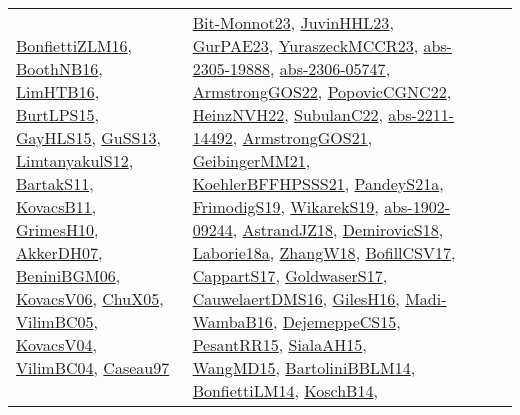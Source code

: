 {\begin{longtable}{llp{6cm}p{6cm}p{6cm}}
\href{papers/BonfiettiZLM16.pdf}{BonfiettiZLM16}\cite{BonfiettiZLM16}, \href{papers/BoothNB16.pdf}{BoothNB16}\cite{BoothNB16}, \href{papers/LimHTB16.pdf}{LimHTB16}\cite{LimHTB16}, \href{papers/BurtLPS15.pdf}{BurtLPS15}\cite{BurtLPS15}, \href{papers/GayHLS15.pdf}{GayHLS15}\cite{GayHLS15}, \href{papers/GuSS13.pdf}{GuSS13}\cite{GuSS13}, \href{articles/LimtanyakulS12.pdf}{LimtanyakulS12}\cite{LimtanyakulS12}, \href{articles/BartakS11.pdf}{BartakS11}\cite{BartakS11}, \href{articles/KovacsB11.pdf}{KovacsB11}\cite{KovacsB11}, \href{papers/GrimesH10.pdf}{GrimesH10}\cite{GrimesH10}, \href{papers/AkkerDH07.pdf}{AkkerDH07}\cite{AkkerDH07}, \href{papers/BeniniBGM06.pdf}{BeniniBGM06}\cite{BeniniBGM06}, \href{papers/KovacsV06.pdf}{KovacsV06}\cite{KovacsV06}, \href{papers/ChuX05.pdf}{ChuX05}\cite{ChuX05}, \href{articles/VilimBC05.pdf}{VilimBC05}\cite{VilimBC05}, \href{papers/KovacsV04.pdf}{KovacsV04}\cite{KovacsV04}, \href{papers/VilimBC04.pdf}{VilimBC04}\cite{VilimBC04}, \href{papers/Caseau97.pdf}{Caseau97}\cite{Caseau97} & \href{papers/Bit-Monnot23.pdf}{Bit-Monnot23}\cite{Bit-Monnot23}, \href{papers/JuvinHHL23.pdf}{JuvinHHL23}\cite{JuvinHHL23}, \href{articles/GurPAE23.pdf}{GurPAE23}\cite{GurPAE23}, \href{articles/YuraszeckMCCR23.pdf}{YuraszeckMCCR23}\cite{YuraszeckMCCR23}, \href{articles/abs-2305-19888.pdf}{abs-2305-19888}\cite{abs-2305-19888}, \href{articles/abs-2306-05747.pdf}{abs-2306-05747}\cite{abs-2306-05747}, \href{papers/ArmstrongGOS22.pdf}{ArmstrongGOS22}\cite{ArmstrongGOS22}, \href{papers/PopovicCGNC22.pdf}{PopovicCGNC22}\cite{PopovicCGNC22}, \href{articles/HeinzNVH22.pdf}{HeinzNVH22}\cite{HeinzNVH22}, \href{articles/SubulanC22.pdf}{SubulanC22}\cite{SubulanC22}, \href{articles/abs-2211-14492.pdf}{abs-2211-14492}\cite{abs-2211-14492}, \href{papers/ArmstrongGOS21.pdf}{ArmstrongGOS21}\cite{ArmstrongGOS21}, \href{papers/GeibingerMM21.pdf}{GeibingerMM21}\cite{GeibingerMM21}, \href{articles/KoehlerBFFHPSSS21.pdf}{KoehlerBFFHPSSS21}\cite{KoehlerBFFHPSSS21}, \href{articles/PandeyS21a.pdf}{PandeyS21a}\cite{PandeyS21a}, \href{papers/FrimodigS19.pdf}{FrimodigS19}\cite{FrimodigS19}, \href{articles/WikarekS19.pdf}{WikarekS19}\cite{WikarekS19}, \href{articles/abs-1902-09244.pdf}{abs-1902-09244}\cite{abs-1902-09244}, \href{papers/AstrandJZ18.pdf}{AstrandJZ18}\cite{AstrandJZ18}, \href{papers/DemirovicS18.pdf}{DemirovicS18}\cite{DemirovicS18}, \href{papers/Laborie18a.pdf}{Laborie18a}\cite{Laborie18a}, \href{articles/ZhangW18.pdf}{ZhangW18}\cite{ZhangW18}, \href{papers/BofillCSV17.pdf}{BofillCSV17}\cite{BofillCSV17}, \href{papers/CappartS17.pdf}{CappartS17}\cite{CappartS17}, \href{papers/GoldwaserS17.pdf}{GoldwaserS17}\cite{GoldwaserS17}, \href{papers/CauwelaertDMS16.pdf}{CauwelaertDMS16}\cite{CauwelaertDMS16}, \href{papers/GilesH16.pdf}{GilesH16}\cite{GilesH16}, \href{papers/Madi-WambaB16.pdf}{Madi-WambaB16}\cite{Madi-WambaB16}, \href{papers/DejemeppeCS15.pdf}{DejemeppeCS15}\cite{DejemeppeCS15}, \href{papers/PesantRR15.pdf}{PesantRR15}\cite{PesantRR15}, \href{papers/SialaAH15.pdf}{SialaAH15}\cite{SialaAH15}, \href{articles/WangMD15.pdf}{WangMD15}\cite{WangMD15}, \href{papers/BartoliniBBLM14.pdf}{BartoliniBBLM14}\cite{BartoliniBBLM14}, \href{papers/BonfiettiLM14.pdf}{BonfiettiLM14}\cite{BonfiettiLM14}, \href{papers/KoschB14.pdf}{KoschB14}\cite{KoschB14}, 
\end{longtable}}
